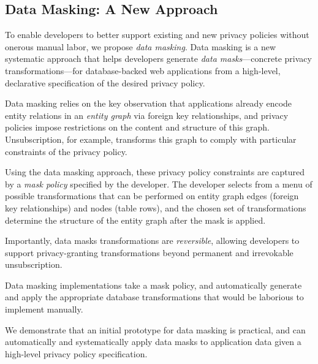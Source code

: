 \subsection{Data Masking: A New Approach}
To enable developers to better support existing and new privacy policies without onerous manual
labor, we propose \emph{data masking}.
%
Data masking is a new systematic approach that helps developers generate
\emph{data masks}---concrete privacy transformations---for database-backed web applications from
a high-level, declarative specification of the desired privacy policy.

Data masking relies on the key observation that applications already encode entity relations in an
\emph{entity graph} via foreign key relationships, and privacy policies impose restrictions on the
content and structure of this graph. Unsubscription, for example, transforms this graph to comply
with particular constraints of the privacy policy.

Using the data masking approach, these privacy policy constraints are captured by a \emph{mask
policy} specified by the developer. The developer selects from a menu of
possible transformations that can be performed on entity graph edges (foreign key relationships) and
nodes (table rows), and the chosen set of transformations determine the structure of the 
entity graph after the mask is applied. 

Importantly, data masks transformations are \emph{reversible}, allowing developers to support
privacy-granting transformations beyond permanent and irrevokable unsubscription. 

Data masking implementations take a mask policy, and automatically generate and apply the
appropriate database transformations that would be laborious to implement manually. 


We demonstrate that an initial prototype for data masking is practical, and can automatically and
systematically apply data masks to application data given a high-level privacy policy
specification.

%

